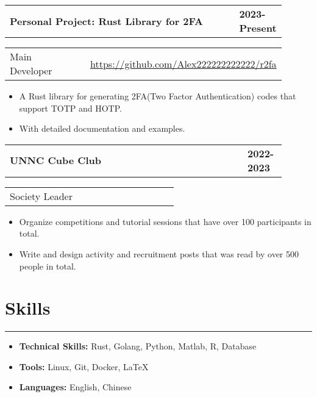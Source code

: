 \documentclass{article}
\begin{document}
    \noindent
    \begin{tabular}{p{0.76\linewidth} p{0.0\linewidth} R{0.14\linewidth}}
        \textbf{Personal Project: Rust Library for 2FA} & & \textbf{2023-Present}
    \end{tabular}

    \noindent
    \begin{tabular}{p{0.43\linewidth} p{0.0\linewidth} R{0.47\linewidth}}
        Main Developer & & \href{https://github.com/Alex222222222222/r2fa}{https://github.com/Alex222222222222/r2fa}
    \end{tabular}

    \noindent
    \begin{itemize}[topsep=0.0em,itemsep=0.0em,parsep=0.0em]
        \item A Rust library for generating 2FA(Two Factor Authentication) codes that support TOTP and HOTP.
        \item With detailed documentation and examples.
    \end{itemize}

    \noindent
    \begin{tabular}{p{0.76\linewidth} p{0.0\linewidth} R{0.14\linewidth}}
        \textbf{UNNC Cube Club} & & \textbf{2022-2023}
    \end{tabular}

    \noindent
    \begin{tabular}{p{0.43\linewidth} p{0.0\linewidth} R{0.47\linewidth}}
        Society Leader & &
    \end{tabular}
    \begin{itemize}[topsep=0.0em,itemsep=0.0em,parsep=0.0em]
        \item Organize competitions and tutorial sessions that have over 100 participants in total.
        \item Write and design activity and recruitment posts that was read by over 500 people in total.
    \end{itemize}

\section*{Skills}
    \hrule
    \vspace{0.5em}

    \begin{itemize}[topsep=0.0em,itemsep=0.0em,parsep=0.0em]
        \item \textbf{Technical Skills:} Rust, Golang, Python, Matlab, R, Database
        \item \textbf{Tools:} Linux, Git, Docker, \LaTeX
        \item \textbf{Languages:} English, Chinese
    \end{itemize}
\end{document}
